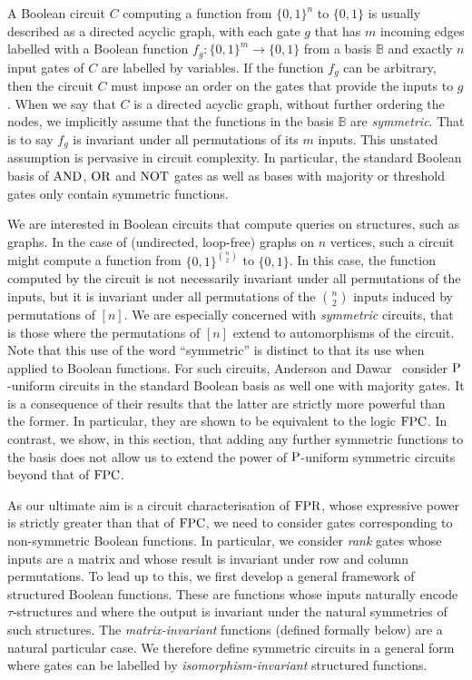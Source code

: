 \documentclass[../main/thesis.tex]{subfiles}
\begin{document}
A Boolean circuit $C$ computing a function from $\{0,1\}^n$ to $\{0,1\}$ is
usually described as a directed acyclic graph, with each gate $g$ that has $m$
incoming edges labelled with a Boolean function $f_g : \{0,1\}^m \rightarrow
\{0,1\}$ from a basis $\mathbb{B}$ and exactly $n$ input gates of $C$ are
labelled by variables. If the function $f_g$ can be arbitrary, then the circuit
$C$ must impose an order on the gates that provide the inputs to $g$. When we
say that $C$ is a directed acyclic graph, without further ordering the nodes, we
implicitly assume that the functions in the basis $\mathbb{B}$ are
\emph{symmetric}. That is to say $f_g$ is invariant under all permutations of
its $m$ inputs. This unstated assumption is pervasive in circuit complexity. In
particular, the standard Boolean basis of $\text{\upshape AND}$, $\text{\upshape OR}$ and $\text{\upshape NOT}$ gates as well
as bases with majority or threshold gates only contain symmetric functions.

We are interested in Boolean circuits that compute queries on structures, such
as graphs. In the case of (undirected, loop-free) graphs on $n$ vertices, such a
circuit might compute a function from $\{0,1\}^{n \choose 2}$ to $\{0,1\}$. In
this case, the function computed by the circuit is not necessarily invariant
under all permutations of the inputs, but it is invariant under all permutations
of the $n \choose 2$ inputs induced by permutations of $[n]$. We are especially
concerned with \emph{symmetric} circuits, that is those where the permutations
of $[n]$ extend to automorphisms of the circuit. Note that this use of the word
``symmetric'' is distinct to that its use when applied to Boolean functions. For
such circuits, Anderson and Dawar~\cite{AndersonD17} consider $\mathrm{P}$-uniform
circuits in the standard Boolean basis as well one with majority gates. It is a
consequence of their results that the latter are strictly more powerful than the
former. In particular, they are shown to be equivalent to the logic $\text{\upshape FPC}$. In
contrast, we show, in this section, that adding any further symmetric functions
to the basis does not allow us to extend the power of $\mathrm{P}$-uniform symmetric
circuits beyond that of $\text{\upshape FPC}$.

As our ultimate aim is a circuit characterisation of $\text{\upshape FPR}$, whose expressive
power is strictly greater than that of $\text{\upshape FPC}$, we need to consider gates
corresponding to non-symmetric Boolean functions. In particular, we consider
\emph{rank} gates whose inputs are a matrix and whose result is invariant under
row and column permutations. To lead up to this, we first develop a general
framework of structured Boolean functions. These are functions whose inputs
naturally encode $\tau$-structures and where the output is invariant under the
natural symmetries of such structures. The \emph{matrix-invariant} functions
(defined formally below) are a natural particular case. We therefore define
symmetric circuits in a general form where gates can be labelled by
\emph{isomorphism-invariant} structured functions.
\end{document}

